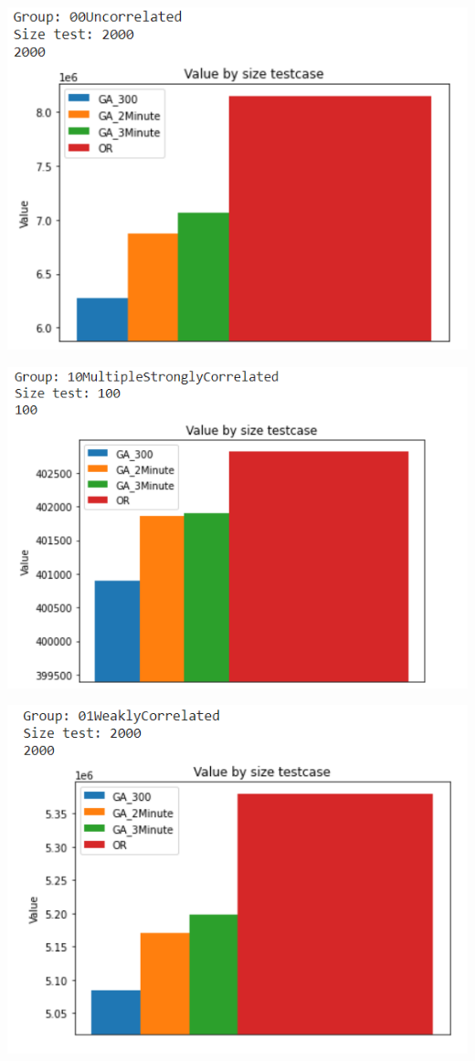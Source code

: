 \documentclass{article}
\begin{document}
\begin{center}
    \centering
    \includegraphics[width=15cm]{image/AI17.png}
\end{center}
\begin{center}
    \centering
    \includegraphics[width=15cm]{image/AI18.png}
\end{center}
\begin{center}
    \centering
    \includegraphics[width=15cm]{image/AI19.png}
\end{center}
\end{document}
